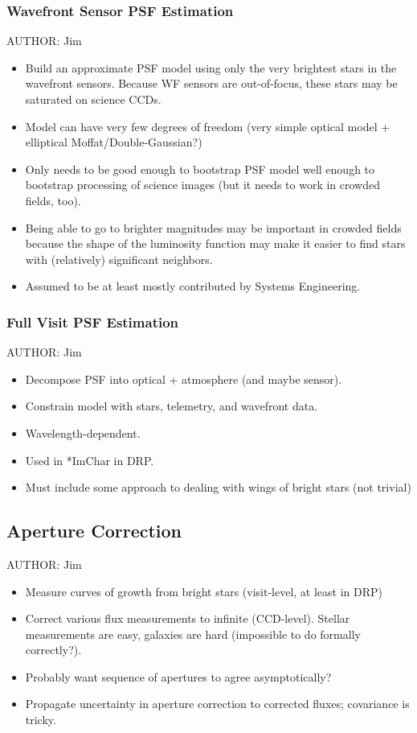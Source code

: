 \subsubsection{Wavefront Sensor PSF Estimation}
\label{sec:acWavefrontSensorPSF}
AUTHOR: Jim
\begin{itemize}
\item Build an approximate PSF model using only the very brightest stars in the wavefront sensors.  Because WF sensors are out-of-focus, these stars may be saturated on science CCDs.
\item Model can have very few degrees of freedom (very simple optical model + elliptical Moffat/Double-Gaussian?)
\item Only needs to be good enough to bootstrap PSF model well enough to bootstrap processing of science images (but it needs to work in crowded fields, too).
\item Being able to go to brighter magnitudes may be important in crowded fields because the shape of the luminosity function may make it easier to find stars with (relatively) significant neighbors.
\item Assumed to be at least mostly contributed by Systems Engineering.
\end{itemize}

\subsubsection{Full Visit PSF Estimation}
\label{sec:acFullVisitPSF}
AUTHOR: Jim
\begin{itemize}
\item Decompose PSF into optical + atmosphere (and maybe sensor).
\item Constrain model with stars, telemetry, and wavefront data.
\item Wavelength-dependent.
\item Used in *ImChar in DRP.
\item Must include some approach to dealing with wings of bright stars (not trivial)
\end{itemize}

\subsection{Aperture Correction}
\label{sec:acApCorr}
AUTHOR: Jim
\begin{itemize}
\item Measure curves of growth from bright stars (visit-level, at least in DRP)
\item Correct various flux measurements to infinite (CCD-level).  Stellar measurements are easy, galaxies are hard (impossible to do formally correctly?).
\item Probably want sequence of apertures to agree asymptotically?
\item Propagate uncertainty in aperture correction to corrected fluxes; covariance is tricky.
\end{itemize}

